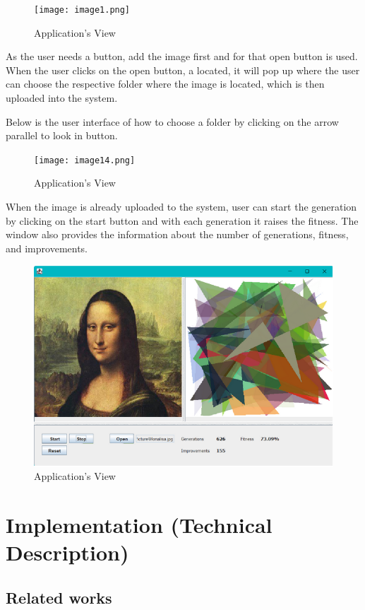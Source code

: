\begin{figure}
\centering
\texttt{[image: image1.png]}
\caption{Application's View}
\end{figure}

{As the user needs a button, add the image first and for that open button is used. When the user clicks on the open button, a located, it will pop up where the user can choose the respective folder where the image is located, which is then uploaded into the system. }

{Below is the user interface of how to choose a folder by clicking on the arrow parallel to look in button.}
\begin{figure}
\centering
\texttt{[image: image14.png]}
\caption{Application's View}
\end{figure}
\clearpage

{
When the image is already uploaded to the system, user can start the generation by clicking on the start button and with each generation it raises the fitness. The window also provides the information about the number of generations, fitness, and
improvements.
}
\begin{figure}
\centering
\includegraphics[width=4.5in]{images/5a 1.png}
\caption{Application's View}
\end{figure}
\clearpage


\chapter{Implementation (Technical Description)}
\label{implementation-technical-description}

\section{Related works}

